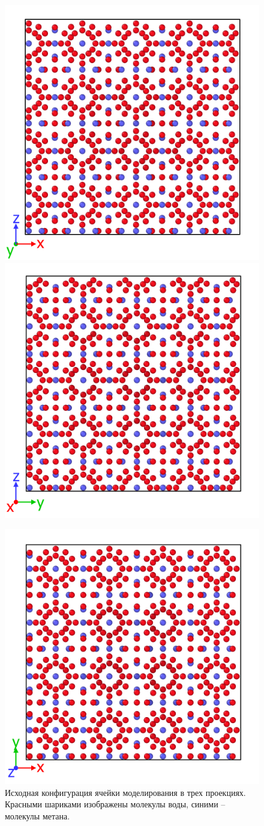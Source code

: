 \begin{figure}[H]
    \centering
    \begin{minipage}{\linewidth}
        \includegraphics[width=.49\linewidth]{figures/unit1.png}
        \includegraphics[width=.49\linewidth]{figures/unit2.png}
    \end{minipage}
    \begin{minipage}{\linewidth}
        \centering
        \includegraphics[width=.5\linewidth]{figures/unit3.png}
    \end{minipage}
    \begin{minipage}{\linewidth}

    \end{minipage}
    \caption{Исходная конфигурация ячейки моделирования в трех проекциях. Красными шариками изображены молекулы воды, синими – молекулы метана.}
    \label{fig3.1}
\end{figure}

